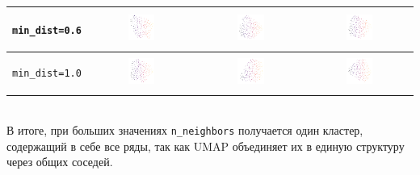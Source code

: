 \begin{tabular}{c|c|c|c}
	\hline
	\begin{sideways} \verb|min_dist=0.6| \end{sideways} & \includegraphics*[width = 0.27\textwidth]{min=0,6,n=10.png} & \includegraphics*[width = 0.27\textwidth]{min=0,6,n=50.png} & \includegraphics*[width = 0.27\textwidth]{min=0,6,n=100.png}\\
	\hline
	\begin{sideways} \verb|min_dist=1.0| \end{sideways} & \includegraphics*[width = 0.27\textwidth]{min=1,0,n=10.png} & \includegraphics*[width = 0.27\textwidth]{min=1,0,n=50.png} & \includegraphics*[width = 0.27\textwidth]{min=1,0,n=100.png}\\
\end{tabular}\\[2mm]

В итоге, при больших значениях \verb|n_neighbors| получается один кластер, содержащий в себе все ряды, так как UMAP объединяет их в единую структуру через общих соседей.